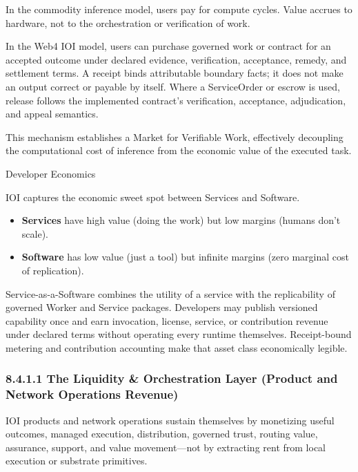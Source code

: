 \documentclass[
  11pt,
]{article}
\providecommand{\tightlist}{%
  \setlength{\itemsep}{0pt}\setlength{\parskip}{0pt}}
\begin{document}
In the commodity inference model, users pay for compute cycles. Value
accrues to hardware, not to the orchestration or verification of work.

In the Web4 IOI model, users can purchase governed work or contract for
an accepted outcome under declared evidence, verification, acceptance,
remedy, and settlement terms. A receipt binds attributable boundary
facts; it does not make an output correct or payable by itself. Where a
ServiceOrder or escrow is used, release follows the implemented contract's
verification, acceptance, adjudication, and appeal semantics.

This mechanism establishes a Market for Verifiable Work, effectively
decoupling the computational cost of inference from the economic value
of the executed task.

Developer Economics

IOI captures the economic sweet spot between Services and Software.

\begin{itemize}
\tightlist
\item
  \textbf{Services} have high value (doing the work) but low margins
  (humans don't scale).
\item
  \textbf{Software} has low value (just a tool) but infinite margins
  (zero marginal cost of replication).
\end{itemize}

Service-as-a-Software combines the utility of a service with the
replicability of governed Worker and Service packages. Developers may
publish versioned capability once and earn invocation, license, service,
or contribution revenue under declared terms without operating every
runtime themselves. Receipt-bound metering and contribution accounting
make that asset class economically legible.

\hypertarget{the-liquidity-orchestration-layer-protocol-revenue}{%
\subsubsection{8.4.1.1 The Liquidity \& Orchestration Layer (Product and
Network Operations Revenue)}\label{the-liquidity-orchestration-layer-protocol-revenue}}

IOI products and network operations sustain themselves by monetizing useful
outcomes, managed execution, distribution, governed trust, routing value,
assurance, support, and value movement---not by extracting rent from local
execution or substrate primitives.
\end{document}
